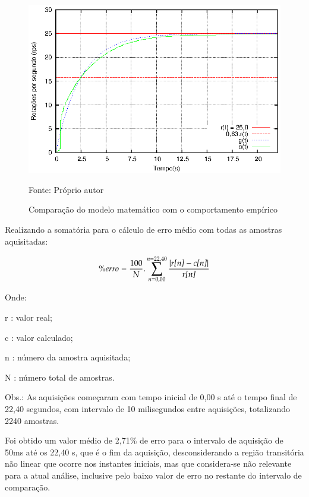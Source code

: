 \begin{figure}[!htb]
\centering
\caption{Comparação do modelo matemático com o comportamento empírico}
\center\includegraphics[scale=1.3]{./imagens/acaoMalhaAbertaTau.eps}

\label{fig:resultadoMalhaAberta}

{\small Fonte: Próprio autor}
\end{figure}

Realizando a somatória para o cálculo de erro médio com todas as amostras aquisitadas: 

\begin{equation}
 \% erro = \frac{100}{N} . \sum_{n = 0,00}^{n=22,40} {\frac{| \text{\emph{r[n]}} -\text{\emph{c[n]}} |}{\text{\emph{r[n]}}} } 
\end{equation}


Onde:

\setlength{\parindent}{2cm}
r : valor real; 

c : valor calculado;

n : número da amostra aquisitada;

N : número total de amostras.

Obs.: As aquisições começaram com tempo inicial de 0,00 s até o tempo final de 22,40 segundos, com intervalo de 10 milisegundos entre aquisições, totalizando 2240 amostras.

\setlength{\parindent}{1cm}


Foi obtido um valor médio de 2,71\% de erro 
para o intervalo de aquisição de 50ms até os 22,40 s, 
que é o fim da aquisição, 
desconsiderando a região transitória não linear 
que ocorre nos instantes iniciais, 
mas que considera-se não relevante para a atual análise, 
inclusive pelo baixo valor de erro no restante do intervalo de comparação.


